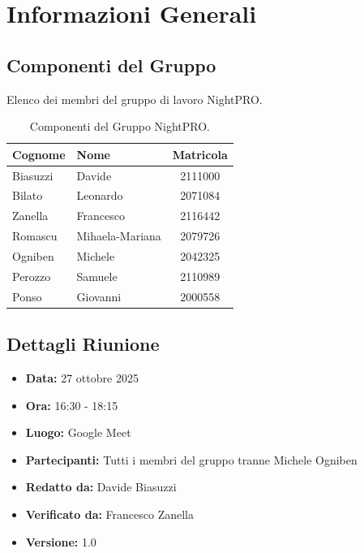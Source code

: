 \documentclass[a4paper, 11pt, oneside]{scrartcl} %
\begin{document}
\newpage
\tableofcontents %
\pagestyle{fancy} %

\newpage
\section{Informazioni Generali}

\subsection{Componenti del Gruppo}
Elenco dei membri del gruppo di lavoro NightPRO.
\begin{table}[h!]
\centering
\begin{tabular}{@{}llc@{}}
\toprule
\textbf{Cognome} & \textbf{Nome} & \textbf{Matricola} \\
\midrule
Biasuzzi & Davide & 2111000 \\
Bilato & Leonardo & 2071084 \\
Zanella & Francesco & 2116442 \\
Romascu & Mihaela-Mariana & 2079726 \\
Ogniben & Michele & 2042325 \\
Perozzo & Samuele & 2110989 \\
Ponso & Giovanni & 2000558 \\
\bottomrule
\end{tabular}
\caption{Componenti del Gruppo NightPRO.}
\end{table}

\subsection{Dettagli Riunione}
\begin{itemize}
    \item \textbf{Data:} 27 ottobre 2025
    \item \textbf{Ora:} 16:30 - 18:15
    \item \textbf{Luogo:} Google Meet
    \item \textbf{Partecipanti:} Tutti i membri del gruppo tranne Michele Ogniben
    \item \textbf{Redatto da: } Davide Biasuzzi
    \item \textbf{Verificato da:} Francesco Zanella
    \item \textbf{Versione: } 1.0
\end{itemize}
\end{document}
